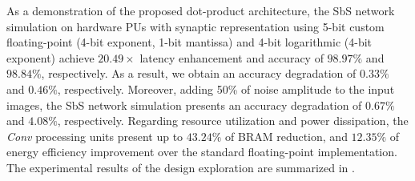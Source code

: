 As a demonstration of the proposed dot-product architecture, the SbS network simulation on hardware PUs with synaptic representation using 5-bit custom floating-point (4-bit exponent, 1-bit mantissa) and 4-bit logarithmic (4-bit exponent) achieve $20.49\times$ latency enhancement and accuracy of $98.97\%$ and $98.84\%$, respectively. As a result, we obtain an accuracy degradation of $0.33\%$ and $0.46\%$, respectively. Moreover, adding 50\% of noise amplitude to the input images, the SbS network simulation presents an accuracy degradation of $0.67\%$ and $4.08\%$, respectively. Regarding resource utilization and power dissipation, the \emph{Conv} processing units present up to $43.24\%$ of BRAM reduction, and $12.35\%$ of energy efficiency improvement over the standard floating-point implementation. The experimental results of the design exploration are summarized in .

